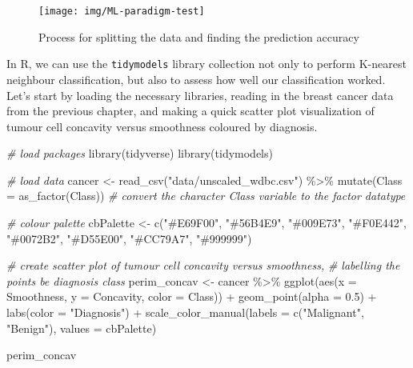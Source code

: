 \documentclass[
]{krantz}
\makeatletter
\newenvironment{Shaded}{\begin{snugshade}}{\end{snugshade}}
\newcommand{\AttributeTok}[1]{\textcolor[rgb]{0.61,0.61,0.61}{#1}}
\newcommand{\CommentTok}[1]{\textcolor[rgb]{0.37,0.37,0.37}{\textit{#1}}}
\newcommand{\FloatTok}[1]{\textcolor[rgb]{0.06,0.06,0.06}{#1}}
\newcommand{\FunctionTok}[1]{\textcolor[rgb]{0,0,0}{#1}}
\newcommand{\NormalTok}[1]{#1}
\newcommand{\OtherTok}[1]{\textcolor[rgb]{0.37,0.37,0.37}{#1}}
\newcommand{\SpecialCharTok}[1]{\textcolor[rgb]{0,0,0}{#1}}
\newcommand{\StringTok}[1]{\textcolor[rgb]{0.5,0.5,0.5}{#1}}
\newenvironment{kframe}{%
\medskip{}
\setlength{\fboxsep}{.8em}
 \def\at@end@of@kframe{}%
 \ifinner\ifhmode%
  \def\at@end@of@kframe{\end{minipage}}%
  \begin{minipage}{\columnwidth}%
 \fi\fi%
 \def\FrameCommand##1{\hskip\@totalleftmargin \hskip-\fboxsep
 \colorbox{shadecolor}{##1}\hskip-\fboxsep
     \hskip-\linewidth \hskip-\@totalleftmargin \hskip\columnwidth}%
 \MakeFramed {\advance\hsize-\width
   \@totalleftmargin\z@ \linewidth\hsize
   \@setminipage}}%
 {\par\unskip\endMakeFramed%
 \at@end@of@kframe}
\renewenvironment{Shaded}{\begin{kframe}}{\end{kframe}}
\makeatother
\begin{document}
\begin{figure}
\texttt{[image: img/ML-paradigm-test]} \caption{Process for splitting the data and finding the prediction accuracy}\label{fig:06-ML-paradigm-test}
\end{figure}

In R, we can use the \texttt{tidymodels} library collection not only to perform K-nearest neighbour
classification, but also to assess how well our classification worked. Let's
start by loading the necessary libraries, reading in the breast cancer data
from the previous chapter, and making a quick scatter plot visualization of
tumour cell concavity versus smoothness coloured by diagnosis.

\begin{Shaded}
\begin{Highlighting}[]
\CommentTok{\# load packages}
\FunctionTok{library}\NormalTok{(tidyverse)}
\FunctionTok{library}\NormalTok{(tidymodels)}

\CommentTok{\# load data}
\NormalTok{cancer }\OtherTok{\textless{}{-}} \FunctionTok{read\_csv}\NormalTok{(}\StringTok{"data/unscaled\_wdbc.csv"}\NormalTok{) }\SpecialCharTok{\%\textgreater{}\%}
  \FunctionTok{mutate}\NormalTok{(}\AttributeTok{Class =} \FunctionTok{as\_factor}\NormalTok{(Class)) }\CommentTok{\# convert the character Class variable to the factor datatype}

\CommentTok{\# colour palette}
\NormalTok{cbPalette }\OtherTok{\textless{}{-}} \FunctionTok{c}\NormalTok{(}\StringTok{"\#E69F00"}\NormalTok{, }\StringTok{"\#56B4E9"}\NormalTok{, }\StringTok{"\#009E73"}\NormalTok{, }\StringTok{"\#F0E442"}\NormalTok{, }\StringTok{"\#0072B2"}\NormalTok{, }\StringTok{"\#D55E00"}\NormalTok{, }\StringTok{"\#CC79A7"}\NormalTok{, }\StringTok{"\#999999"}\NormalTok{)}

\CommentTok{\# create scatter plot of tumour cell concavity versus smoothness,}
\CommentTok{\# labelling the points be diagnosis class}
\NormalTok{perim\_concav }\OtherTok{\textless{}{-}}\NormalTok{ cancer }\SpecialCharTok{\%\textgreater{}\%}
  \FunctionTok{ggplot}\NormalTok{(}\FunctionTok{aes}\NormalTok{(}\AttributeTok{x =}\NormalTok{ Smoothness, }\AttributeTok{y =}\NormalTok{ Concavity, }\AttributeTok{color =}\NormalTok{ Class)) }\SpecialCharTok{+}
  \FunctionTok{geom\_point}\NormalTok{(}\AttributeTok{alpha =} \FloatTok{0.5}\NormalTok{) }\SpecialCharTok{+}
  \FunctionTok{labs}\NormalTok{(}\AttributeTok{color =} \StringTok{"Diagnosis"}\NormalTok{) }\SpecialCharTok{+}
  \FunctionTok{scale\_color\_manual}\NormalTok{(}\AttributeTok{labels =} \FunctionTok{c}\NormalTok{(}\StringTok{"Malignant"}\NormalTok{, }\StringTok{"Benign"}\NormalTok{), }\AttributeTok{values =}\NormalTok{ cbPalette)}

\NormalTok{perim\_concav}
\end{Highlighting}
\end{Shaded}
\end{document}
